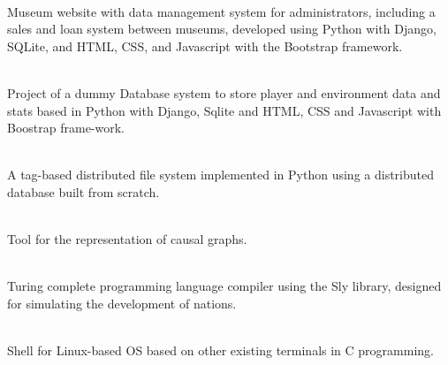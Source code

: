 \documentclass[9pt, blue]{./template/developercv} %
\begin{document}
\hfill
\begin{minipage}[t]{0.60\textwidth}
	\vspace{-\baselineskip} %

	\vspace{1.2mm}
	\textcolor{accentbackground}{\faCode}\hspace{0.5mm}
	\small \textbf{} \\
	\footnotesize Museum website with data management system for administrators, including a sales and loan system between museums, developed using Python with Django, SQLite, and HTML, CSS, and Javascript with the Bootstrap framework.

	\vspace{1.2mm}
	\textcolor{accentbackground}{\faCode}\hspace{0.5mm}
	\small \textbf{} \\
	\footnotesize Project of a dummy Database system to store player and environment data and stats based in Python with Django, Sqlite and HTML, CSS and Javascript with Boostrap frame-work.

	\vspace{1.2mm}
	\textcolor{accentbackground}{\faCode}\hspace{0.5mm}
	\small \textbf{} \\
	\footnotesize A tag-based distributed file system implemented in Python using a distributed database built from scratch.

	\vspace{1.2mm}
	\textcolor{accentbackground}{\faCode}\hspace{0.5mm}
	\small \textbf{} \\
	\footnotesize Tool for the representation of causal graphs.

	\vspace{1.2mm}
	\textcolor{accentbackground}{\faCode}\hspace{0.5mm}
	\small \textbf{} \\
	\footnotesize Turing complete programming language compiler using the Sly library, designed for simulating the development of nations.

	
	\vspace{1.2mm}
	\textcolor{accentbackground}{\faCode}\hspace{0.5mm}
	\small \textbf{} \\
	\footnotesize Shell for Linux-based OS based on other existing terminals in C programming.


\end{minipage}
\end{document}
